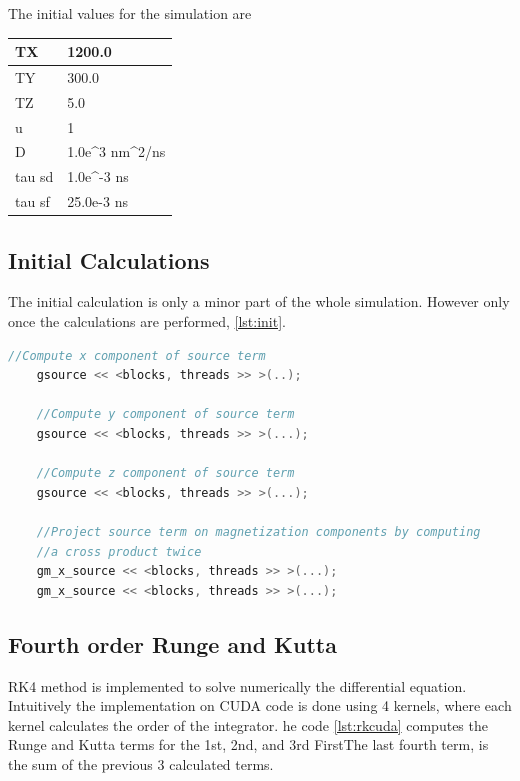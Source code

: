 The initial values for the simulation are

\begin{table}[h]
\centering
\begin{tabular}{| l | l |}
\hline
TX     & 1200.0                                         \\
\hline
TY     & 300.0                                          \\
\hline
TZ     & 5.0                                            \\
\hline
u      & 1                                              \\
\hline
D      & 1.0e\textasciicircum 3 nm\textasciicircum 2/ns \\
\hline
tau sd & 1.0e\textasciicircum -3 ns                     \\
\hline
tau sf & 25.0e-3 ns      \\
\hline
\end{tabular}
\end{table}

\subsection{Initial Calculations}

The initial calculation is only a minor part of the whole simulation. However only once the calculations are performed, \ref{lst:init}.

\begin{lstlisting}[language=C++, label={lst:init}, caption={CPU Vector Addition}]
    //Compute x component of source term
    gsource << <blocks, threads >> >(..);

    //Compute y component of source term
    gsource << <blocks, threads >> >(...);

    //Compute z component of source term
    gsource << <blocks, threads >> >(...);

    //Project source term on magnetization components by computing
    //a cross product twice
    gm_x_source << <blocks, threads >> >(...);
    gm_x_source << <blocks, threads >> >(...);

\end{lstlisting}


\subsection{Fourth order Runge and Kutta}

 RK4 method is implemented to solve numerically the differential equation. Intuitively the implementation on CUDA code is done using 4 kernels, where each kernel calculates the order of the integrator. he code \ref{lst:rkcuda} computes the Runge and Kutta terms for the 1st, 2nd, and 3rd FirstThe last fourth term, is the sum of the previous 3 calculated terms.

